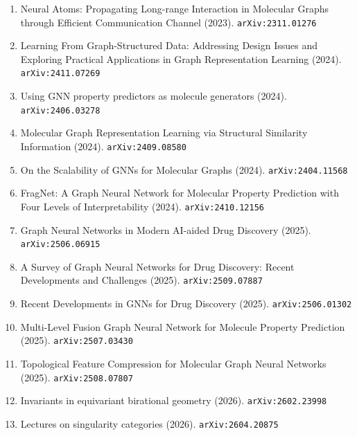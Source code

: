 \documentclass[11pt]{article}
\begin{document}
\begin{enumerate}
  Graph Representations for Compound Property and Activity Prediction (2023). \texttt{arXiv:2304.06253}
  \item Neural Atoms: Propagating Long-range Interaction in Molecular Graphs
  through Efficient Communication Channel (2023). \texttt{arXiv:2311.01276}
  \item Learning From Graph-Structured Data: Addressing Design Issues and
  Exploring Practical Applications in Graph Representation Learning (2024). \texttt{arXiv:2411.07269}
  \item Using GNN property predictors as molecule generators (2024). \texttt{arXiv:2406.03278}
  \item Molecular Graph Representation Learning via Structural Similarity
  Information (2024). \texttt{arXiv:2409.08580}
  \item On the Scalability of GNNs for Molecular Graphs (2024). \texttt{arXiv:2404.11568}
  \item FragNet: A Graph Neural Network for Molecular Property Prediction with Four Levels of Interpretability (2024). \texttt{arXiv:2410.12156}
  \item Graph Neural Networks in Modern AI-aided Drug Discovery (2025). \texttt{arXiv:2506.06915}
  \item A Survey of Graph Neural Networks for Drug Discovery: Recent Developments and Challenges (2025). \texttt{arXiv:2509.07887}
  \item Recent Developments in GNNs for Drug Discovery (2025). \texttt{arXiv:2506.01302}
  \item Multi-Level Fusion Graph Neural Network for Molecule Property Prediction (2025). \texttt{arXiv:2507.03430}
  \item Topological Feature Compression for Molecular Graph Neural Networks (2025). \texttt{arXiv:2508.07807}
  \item Invariants in equivariant birational geometry (2026). \texttt{arXiv:2602.23998}
  \item Lectures on singularity categories (2026). \texttt{arXiv:2604.20875}
\end{enumerate}
\end{document}
